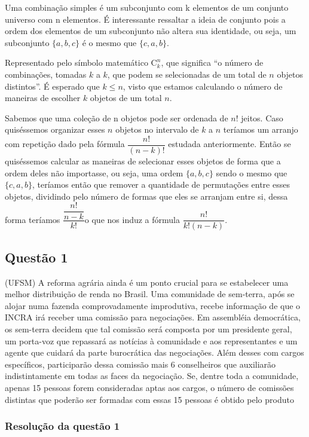 Uma combinação simples é um subconjunto com k elementos de um conjunto universo com n elementos. É interessante ressaltar a ideia de conjunto pois a ordem dos elementos de um subconjunto não altera sua identidade, ou seja, um subconjunto $\{a, b, c\}$ é o mesmo que $\{c , a, b\}$.

Representado pelo símbolo matemático $\mathrm{C}_k^n$, que significa ``o número de combinações, tomadas $k$ a $k$, que podem se selecionadas de um total de $n$ objetos distintos''.  É esperado que $k \leq n$, visto que estamos calculando o número de maneiras de escolher $k$ objetos de um total $n$.

Sabemos que uma coleção de n objetos pode ser ordenada de $n!$ jeitos. Caso quiséssemos organizar esses $n$ objetos no intervalo de $k$ a $n$ teríamos um arranjo com repetição dado pela fórmula $ \dfrac{n!}{(n - k)!}$ estudada anteriormente. Então se quiséssemos calcular as maneiras de selecionar esses objetos de forma que a ordem deles não importasse, ou seja, uma ordem $\{a, b, c\}$ sendo o mesmo que $\{c , a, b\}$, teríamos então que remover a quantidade de permutações entre esses objetos, dividindo pelo número de formas que eles se arranjam entre si, dessa forma teríamos $\dfrac{\dfrac{n!}{n-k}}{k!}$o que nos induz a fórmula $\dfrac{n!}{k!(n-k)}$.

\subsection*{Questão 1}

(UFSM) A reforma agrária ainda é um ponto crucial para se estabelecer uma melhor distribuição de renda no Brasil. Uma comunidade de sem-terra, após se alojar numa fazenda comprovadamente improdutiva, recebe informação de que o INCRA irá receber uma comissão para negociações. Em assembléia democrática, os sem-terra decidem que tal comissão será composta por um presidente geral, um porta-voz que repassará as notícias à comunidade e aos representantes e um agente que cuidará da parte burocrática das negociações. Além desses com cargos específicos, participarão dessa comissão mais 6 conselheiros que auxiliarão indistintamente em todas as faces da negociação.
Se, dentre toda a comunidade, apenas 15 pessoas forem consideradas aptas aos cargos, o número de comissões distintas que poderão ser formadas com essas 15 pessoas é obtido pelo produto

\subsubsection*{Resolução da questão 1}

